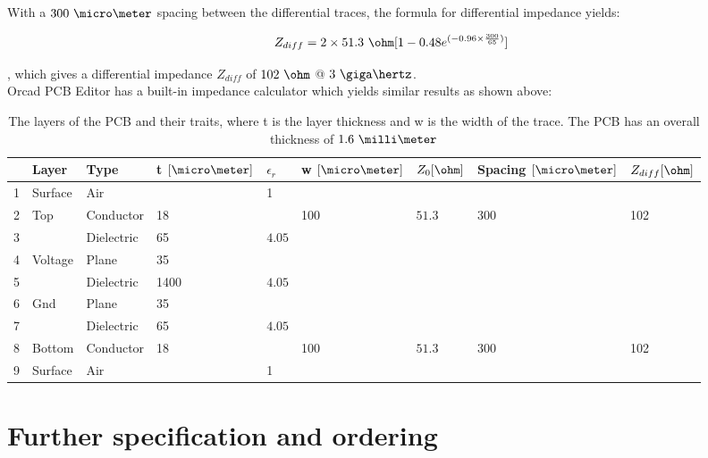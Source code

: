 \documentclass[main.tex]{subfiles}
\begin{document}
With a $300\ \micro\meter$ spacing between the differential traces, the formula for differential impedance yields:

\begin{equation}
    Z_{diff} = 2 \times 51.3\ \ohm [1 - 0.48 e^{(-0.96 \times \frac{300}{65})}]
  \label{eq:zdiff}
\end{equation}

, which gives a differential impedance $Z_{diff}$ of $102\ \ohm$ @ $3\ \giga\hertz$.\\

Orcad PCB Editor has a built-in impedance calculator which yields similar results as shown above:

\begin{table} [H]
\begin{center}
    \begin{tabular}{| l | l | l | l | l | l | l | l | l |}
    \hline
     & Layer & Type & t $[\micro\meter]$ & $\epsilon_r$ & w $[\micro\meter]$  & $Z_0 [\ohm]$ & Spacing $[\micro\meter]$  & $Z_{diff} [\ohm]$ \\ 
     \hline
    1 	  & Surface & Air 		 & 		& 1 	 & 	   & 					& 	  & \\ \hline
    2 	  & Top 	& Conductor  & 18 	&        & 100 & $51.3$             & 300 & 102\\ \hline
    3 	  &  		& Dielectric & 65 	& $4.05$ & 	   & 					& 	  & \\ \hline
    4 	  & Voltage & Plane 	 & 35 	&        & 	   & 					& 	  & \\ \hline
    5 	  &  		& Dielectric & 1400 & $4.05$ & 	   &					&	  & \\ \hline
    6 	  & Gnd 	& Plane 	 & 35 	&        & 	   & 					& 	  & \\ \hline
    7 	  &  		& Dielectric & 65 	& $4.05$ &     & 					& 	  & \\ \hline
    8 	  & Bottom 	& Conductor  & 18 	&        & 100 & $51.3$             & 300 & 102\\ \hline
    9 	  & Surface & Air 		 & 	  	& 1 	 & 	   & 					& 	  & \\ \hline
    \end{tabular}
     \caption{The layers of the PCB and their traits, where t is the layer thickness and w is the width of the trace. The PCB has an overall thickness of $1.6\ \milli\meter$}
	\label{tab:Xsect1}
\end{center}
\end{table}

\section{Further specification and ordering}
\end{document}
